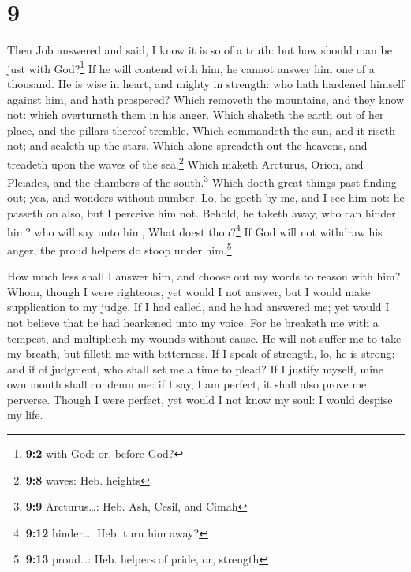 \hypertarget{section-8}{%
\section{9}\label{section-8}}

 Then Job answered and said,  I know it is
so of a truth: but how should man be just with God?\footnote{\textbf{9:2}
  with God: or, before God?}  If he will contend with him,
he cannot answer him one of a thousand.  He is wise in
heart, and mighty in strength: who hath hardened himself against him,
and hath prospered?  Which removeth the mountains, and
they know not: which overturneth them in his anger.  Which
shaketh the earth out of her place, and the pillars thereof tremble.
 Which commandeth the sun, and it riseth not; and sealeth
up the stars.  Which alone spreadeth out the heavens, and
treadeth upon the waves of the sea.\footnote{\textbf{9:8} waves: Heb.
  heights}  Which maketh Arcturus, Orion, and Pleiades,
and the chambers of the south.\footnote{\textbf{9:9} Arcturus\ldots:
  Heb. Ash, Cesil, and Cimah}  Which doeth great things
past finding out; yea, and wonders without number.  Lo,
he goeth by me, and I see him not: he passeth on also, but I perceive
him not.  Behold, he taketh away, who can hinder him? who
will say unto him, What doest thou?\footnote{\textbf{9:12} hinder\ldots:
  Heb. turn him away?}  If God will not withdraw his
anger, the proud helpers do stoop under him.\footnote{\textbf{9:13}
  proud\ldots: Heb. helpers of pride, or, strength}

 How much less shall I answer him, and choose out my
words to reason with him?  Whom, though I were righteous,
yet would I not answer, but I would make supplication to my judge.
 If I had called, and he had answered me; yet would I not
believe that he had hearkened unto my voice.  For he
breaketh me with a tempest, and multiplieth my wounds without cause.
 He will not suffer me to take my breath, but filleth me
with bitterness.  If I speak of strength, lo, he is
strong: and if of judgment, who shall set me a time to plead?
 If I justify myself, mine own mouth shall condemn me: if
I say, I am perfect, it shall also prove me perverse. 
Though I were perfect, yet would I not know my soul: I would despise my
life.

